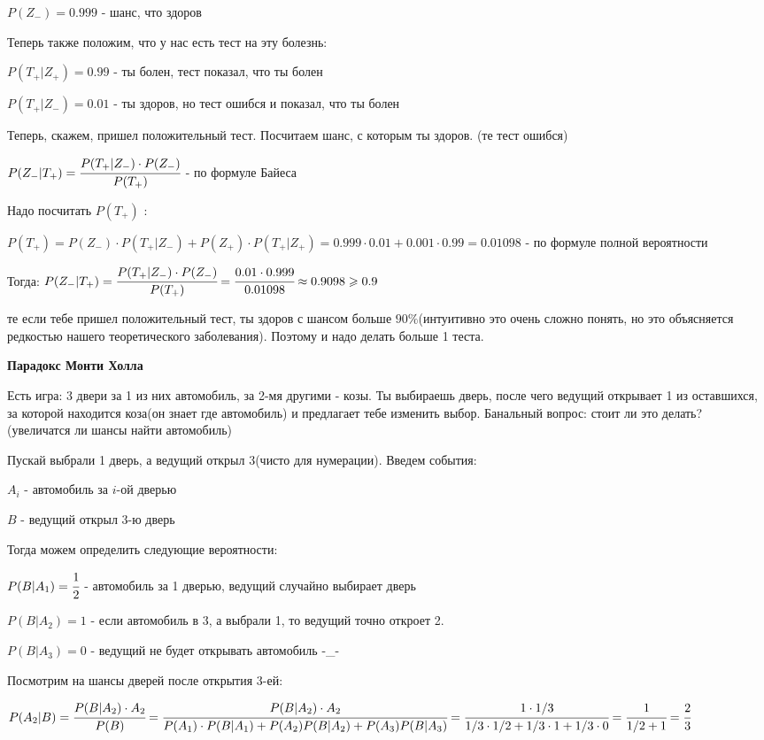 \documentclass[a4paper]{article}
\begin{document}
\begin{colloq}
	$P(Z_-) = 0.999$ - шанс,  что здоров
	
	Теперь также положим, что у нас есть тест на эту болезнь:
	
	$P(T_+ | Z_+) = 0.99$ - ты болен, тест показал,  что ты болен
	
	$P(T_+ | Z_-) = 0.01$ - ты здоров, но тест ошибся и показал, что ты болен
	
	Теперь, скажем, пришел положительный тест. Посчитаем шанс, с которым ты здоров. (те тест ошибся)
	
	$P(Z_- | T_+) = \cfrac{P(T_+ | Z_-) \cdot P(Z_-)}{P(T_+)}$ - по формуле Байеса
	
	Надо посчитать $P(T_+)$ :
	
	$P(T_+) = P(Z_-) \cdot P(T_+ | Z_-) + P(Z_+) \cdot P(T_+ | Z_+) = 0.999 \cdot 0.01 + 0.001 \cdot 0.99 = 0.01098$ - по формуле полной вероятности
	
	Тогда: $P(Z_- | T_+) = \cfrac{P(T_+ | Z_-) \cdot P(Z_-)}{P(T_+)}  = \cfrac{0.01 \cdot 0.999}{0.01098} \approx 0.9098 \geq 0.9$ 
	
	те если тебе пришел положительный тест, ты здоров с шансом больше $90\%$(интуитивно это очень сложно понять, но это объясняется редкостью нашего теоретического заболевания). Поэтому и надо делать больше 1 теста.
	
	\textbf{Парадокс Монти Холла}
	
	Есть игра: 3 двери за 1 из них автомобиль, за 2-мя другими - козы. Ты выбираешь дверь, после чего ведущий открывает 1 из оставшихся, за которой находится коза(он знает где автомобиль) и предлагает тебе изменить выбор. Банальный вопрос: стоит ли это делать? (увеличатся ли шансы найти автомобиль)
	
	Пускай выбрали 1 дверь, а ведущий открыл 3(чисто для нумерации). Введем события:
	
	$A_i $ - автомобиль за $i$-ой дверью 
	
	$B $ - ведущий открыл 3-ю дверь 
	
	Тогда можем определить следующие вероятности:
	
	$P(B| A_1) = \cfrac 12$ - автомобиль за 1 дверью, ведущий случайно выбирает дверь
	
	$P(B| A_2) = 1$ - если автомобиль в 3, а выбрали 1, то ведущий точно откроет 2.
	
	$P(B| A_3) = 0$ - ведущий не будет открывать автомобиль -\_-
	
	Посмотрим на шансы дверей после открытия 3-ей:
	
	$P(A_2| B) = \cfrac {P(B| A_2) \cdot A_2}{P(B)} = \cfrac {P(B| A_2) \cdot A_2}{P(A_1)\cdot P(B| A_1) + P(A_2)P(B| A_2) + P(A_3)P(B| A_3)} = \cfrac {1 \cdot 1/3}{1/3 \cdot 1/2 + 1/3 \cdot 1 + 1/3 \cdot 0} = \cfrac {1}{1/2 + 1} = \cfrac 23$
	

\end{colloq}
\end{document}
